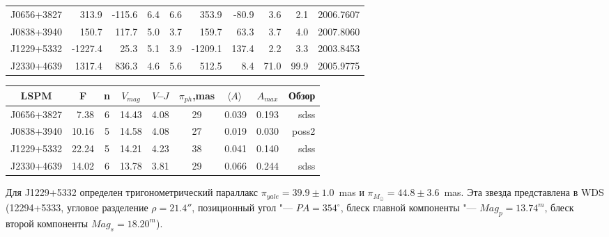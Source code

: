 \begin{table}[t]
\begin{tabularx}{\textwidth}{l|r|r|r|r|r|r|r|r|c}
J0656+3827&   313.9& -115.6& 6.4& 6.6&   353.9& -80.9&  3.6&  2.1& 2006.7607\\
J0838+3940&   150.7&  117.7& 5.0& 3.7&   159.7&  63.3&  3.7&  4.0& 2007.8060\\
J1229+5332& -1227.4&   25.3& 5.1& 3.9& -1209.1& 137.4&  2.2&  3.3& 2003.8453\\
J2330+4639&  1317.4&  836.3& 4.6& 5.6&   512.5&   8.4& 71.0& 99.9& 2005.9775\\ \hline
\end{tabularx}
\begin{tabularx}{\textwidth}{c|r|c|c|c|c|c|c|r} %

LSPM &\multicolumn{1}{c|}{F} & n & $V_{mag}$ &{\small$V$--$J$}&$\pi_{ph}$,mas&$\langle A\rangle\ $& $A_{max}$&\multicolumn{1}{c}{Обзор}\\ \hline

J0656+3827&    7.38& 6 &  14.43&   4.08&  29&0.039 &0.193& sdss\\
J0838+3940&   10.16& 5 &  14.58&   4.08&  27&0.019 &0.030&poss2\\
J1229+5332&   22.24& 5 &  14.21&   4.23&  38&0.041 &0.140& sdss\\
J2330+4639&   14.02& 6 &  13.78&   3.81&  29&0.066 &0.244& sdss\\ \hline
\end{tabularx}         	  
\begin{flushleft}
\footnotesize 
Для J1229+5332 определен тригонометрический параллакс $\pi_{yale}=39.9\pm1.0$~mas и $\pi_{M_{\odot}}=44.8\pm3.6$~mas.
Эта звезда представлена в WDS (12294+5333, угловое разделение $\rho=21.4''$, позиционный угол "--- $PA=354^{\circ}$, блеск главной компоненты "--- $Mag_p = 13.74^m$, блеск второй компоненты $Mag_s = 18.20^m$).
\end{flushleft}
\end{table}